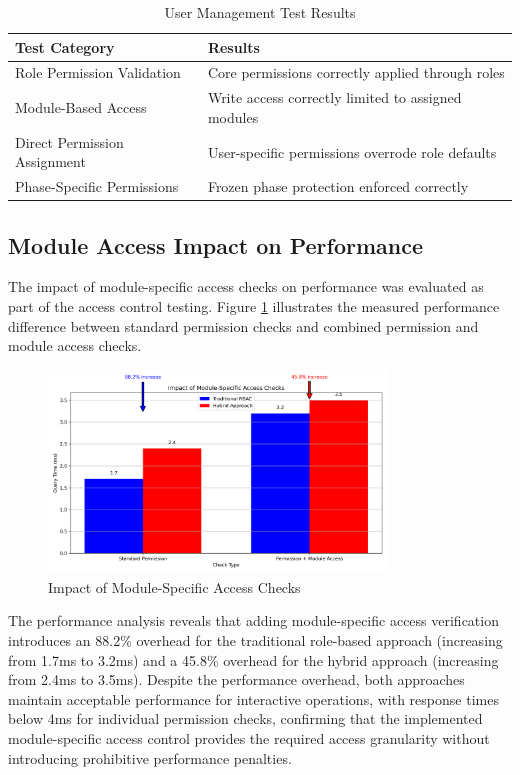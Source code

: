 \begin{table}[h]
    \centering
    \caption{User Management Test Results}
    \label{tab:rbac-test-results}
    \begin{tabular}{|p{3cm}|p{5cm}|}
    \hline
    \textbf{Test Category} & \textbf{Results} \\
    \hline
    Role Permission Validation & Core permissions correctly applied through roles \\
    \hline
    Module-Based Access & Write access correctly limited to assigned modules \\
    \hline
    Direct Permission Assignment & User-specific permissions overrode role defaults \\
    \hline
    Phase-Specific Permissions & Frozen phase protection enforced correctly \\
    \hline
    \end{tabular}
\end{table}

\subsection{Module Access Impact on Performance}
\label{subsec:module-access-impact}

The impact of module-specific access checks on performance was evaluated as part of the access control testing. Figure \ref{fig:module-access-impact} illustrates the measured performance difference between standard permission checks and combined permission and module access checks.

\begin{figure}[h]
    \centering
    \includegraphics[width=0.8\textwidth]{figures/module_access_impact.png}
    \caption{Impact of Module-Specific Access Checks}
    \label{fig:module-access-impact}
\end{figure}

The performance analysis reveals that adding module-specific access verification introduces an 88.2\% overhead for the traditional role-based approach (increasing from 1.7ms to 3.2ms) and a 45.8\% overhead for the hybrid approach (increasing from 2.4ms to 3.5ms). Despite the performance overhead, both approaches maintain acceptable performance for interactive operations, with response times below 4ms for individual permission checks, confirming that the implemented module-specific access control provides the required access granularity without introducing prohibitive performance penalties.

